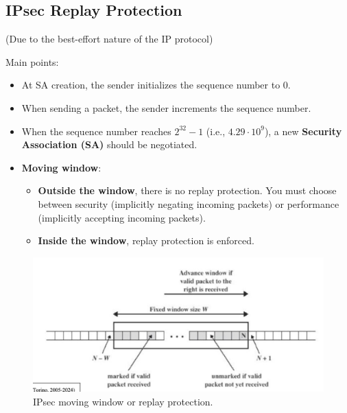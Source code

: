 \subsection{IPsec Replay Protection}
\begin{center}
    (Due to the best-effort nature of the IP protocol)
\end{center}
Main points:
\begin{itemize}
    \item At SA creation, the sender initializes the sequence number to 0.
    \item When sending a packet, the sender increments the sequence number.
    \item When the sequence number reaches \( 2^{32} - 1 \) (i.e., \( 4.29 \cdot 10^{9}\)), a new \textbf{Security Association (SA)} should be negotiated.
    \item \textbf{Moving window}:
    \begin{itemize}
        \item \textbf{Outside the window}, there is no replay protection. You must choose between security (implicitly negating incoming packets) or performance (implicitly accepting incoming packets).
        \item \textbf{Inside the window}, replay protection is enforced.
    \end{itemize}
\end{itemize}

\begin{figure}[H]
  \includegraphics[width=\linewidth]{Images/NetSec/ipsec_replay_protection.png}
  \caption{IPsec moving window or replay protection.}
\end{figure}


